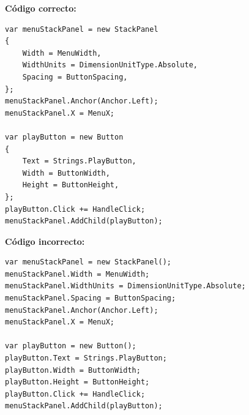 \textbf{Código correcto:}
\begin{lstlisting}[style=csharpstyle]
var menuStackPanel = new StackPanel
{
    Width = MenuWidth,
    WidthUnits = DimensionUnitType.Absolute,
    Spacing = ButtonSpacing,
};
menuStackPanel.Anchor(Anchor.Left);
menuStackPanel.X = MenuX;

var playButton = new Button
{
    Text = Strings.PlayButton,
    Width = ButtonWidth,
    Height = ButtonHeight,
};
playButton.Click += HandleClick;
menuStackPanel.AddChild(playButton);
\end{lstlisting}

\textbf{Código incorrecto:}
\begin{lstlisting}[style=csharpstyle]
var menuStackPanel = new StackPanel();
menuStackPanel.Width = MenuWidth;
menuStackPanel.WidthUnits = DimensionUnitType.Absolute;
menuStackPanel.Spacing = ButtonSpacing;
menuStackPanel.Anchor(Anchor.Left);
menuStackPanel.X = MenuX;

var playButton = new Button();
playButton.Text = Strings.PlayButton;
playButton.Width = ButtonWidth;
playButton.Height = ButtonHeight;
playButton.Click += HandleClick;
menuStackPanel.AddChild(playButton);
\end{lstlisting}
